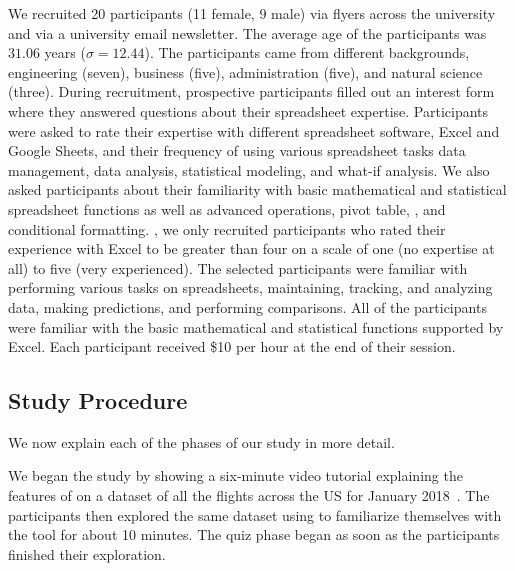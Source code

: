  We recruited 20 participants (11 female, 9 male) via flyers across the university and via a university email newsletter. 
The average age of the participants was $31.06$ years ($\sigma = 12.44$). 
The participants came from different backgrounds, 
\eg engineering (seven), business (five), administration (five), and natural science (three). 
During recruitment, 
prospective participants filled out an interest form
where they answered questions about their spreadsheet expertise.
Participants were asked to rate their expertise with
different spreadsheet software, \eg Excel and Google Sheets, 
and their frequency of using various spreadsheet 
tasks \eg data management, data analysis, statistical modeling, and what-if analysis.
We also asked participants about their familiarity 
with basic mathematical and statistical spreadsheet functions
as well as advanced operations, \eg pivot table,
 , and conditional formatting. 
, 
we only recruited participants who rated their experience 
with Excel to be greater than four on a scale of one (no expertise at all) to five (very experienced). 
The selected participants were familiar with performing 
various tasks on spreadsheets, \eg maintaining, tracking, and
analyzing data, making predictions, and performing comparisons. 
All of the participants were familiar with the basic mathematical
and statistical functions supported by Excel. 
Each participant received \$10 per hour at the end of their session.

\subsection{Study Procedure}
\label{sec:procedure}
We now explain each of the phases of our study in more detail.
 
We began the study by showing a six-minute video tutorial explaining the features of \noah on a dataset of all the flights across the US for January 2018~\cite{web:flight}. The participants then explored the same dataset using \noah to familiarize themselves with the tool for about 10 minutes. The quiz phase began as soon as the participants finished their exploration. 

